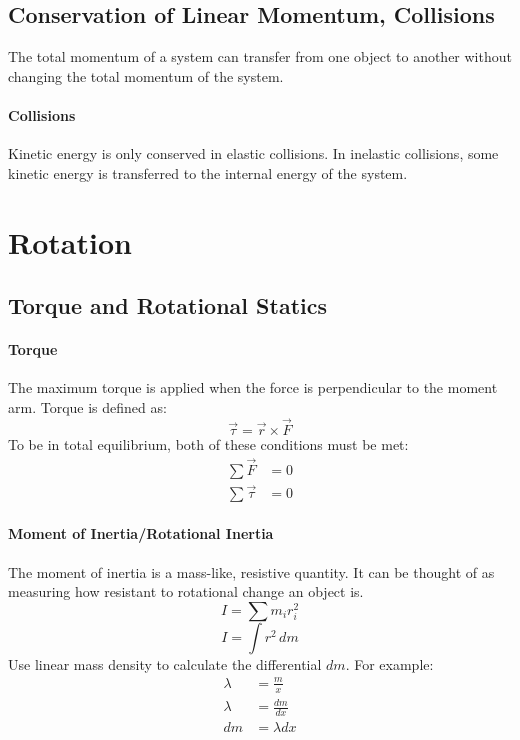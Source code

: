 \documentclass{article}
\begin{document}
        \subsection{Conservation of Linear Momentum, Collisions}
            The total momentum of a system can transfer from one object to another without changing the total momentum of the system.

            \paragraph{Collisions}
            Kinetic energy is only conserved in elastic collisions. In inelastic collisions, some kinetic energy is transferred to the internal energy of the system.

    \section{Rotation}

        \subsection{Torque and Rotational Statics}
            \paragraph{Torque}
            The maximum torque is applied when the force is perpendicular to the moment arm. Torque is defined as:
            \begin{equation}
                \vec{\tau} = \vec{r} \times \vec{F}
            \end{equation}
            To be in total equilibrium, both of these conditions must be met:
            \begin{align}
                \sum \vec{F} &= 0 \\
                \sum \vec{\tau} &= 0
            \end{align}

            \paragraph{Moment of Inertia/Rotational Inertia}
            The moment of inertia is a mass-like, resistive quantity. It can be thought of as measuring how resistant to rotational change an object is.
            \begin{equation}
                I = \sum m_i r_i^2
            \end{equation}
            \begin{equation}
                I = \int r^2 \, dm
            \end{equation}
            Use linear mass density to calculate the differential $dm$. For example:
            \begin{align}
                \lambda &= \frac{m}{x} \nonumber\\
                \lambda &= \frac{dm}{dx} \nonumber\\
                dm &= \lambda dx \nonumber
            \end{align}
\end{document}
